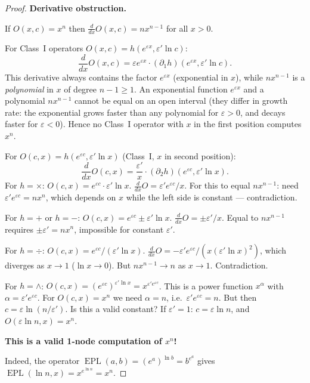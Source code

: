 \documentclass[12pt,a4paper]{article}
\theoremstyle{definition}
\newcommand{\EPL}{\operatorname{EPL}}
\begin{document}
\begin{proof}
\noindent\textbf{Derivative obstruction.}

If $O(x,c)=x^n$ then $\frac{d}{dx}O(x,c) = nx^{n-1}$ for all $x>0$.

For Class~I operators $O(x,c) = h(e^{\varepsilon x}, \varepsilon'\ln c)$:
\[
  \frac{d}{dx}O(x,c) = \varepsilon e^{\varepsilon x} \cdot (\partial_1 h)(e^{\varepsilon x}, \varepsilon'\ln c).
\]
This derivative always contains the factor $e^{\varepsilon x}$ (exponential in $x$),
while $nx^{n-1}$ is a \emph{polynomial} in $x$ of degree $n-1\geq 1$.
An exponential function $e^{\varepsilon x}$ and a polynomial $nx^{n-1}$ cannot be
equal on an open interval (they differ in growth rate: the exponential grows faster
than any polynomial for $\varepsilon>0$, and decays faster for $\varepsilon<0$).
Hence no Class~I operator with $x$ in the first position computes $x^n$.

For $O(c,x) = h(e^{\varepsilon c}, \varepsilon'\ln x)$ (Class~I, $x$ in second position):
\[
  \frac{d}{dx}O(c,x) = \frac{\varepsilon'}{x} \cdot (\partial_2 h)(e^{\varepsilon c}, \varepsilon'\ln x).
\]
For $h=\times$: $O(c,x) = e^{\varepsilon c}\cdot\varepsilon'\ln x$.
$\frac{d}{dx}O = \varepsilon'e^{\varepsilon c}/x$.
For this to equal $nx^{n-1}$: need $\varepsilon'e^{\varepsilon c} = nx^n$, which
depends on $x$ while the left side is constant --- contradiction.

For $h=+$ or $h=-$: $O(c,x) = e^{\varepsilon c} \pm \varepsilon'\ln x$.
$\frac{d}{dx}O = \pm\varepsilon'/x$.
Equal to $nx^{n-1}$ requires $\pm\varepsilon'=nx^n$, impossible for constant $\varepsilon'$.

For $h=\div$: $O(c,x) = e^{\varepsilon c}/(\varepsilon'\ln x)$.
$\frac{d}{dx}O = -\varepsilon'e^{\varepsilon c}/(x(\varepsilon'\ln x)^2)$,
which diverges as $x\to 1$ ($\ln x\to 0$).
But $nx^{n-1}\to n$ as $x\to 1$.  Contradiction.

For $h=\wedge$: $O(c,x) = (e^{\varepsilon c})^{\varepsilon'\ln x} = x^{\varepsilon'e^{\varepsilon c}}$.
This is a power function $x^\alpha$ with $\alpha = \varepsilon'e^{\varepsilon c}$.
For $O(c,x) = x^n$ we need $\alpha = n$, i.e.\ $\varepsilon'e^{\varepsilon c}=n$.
But then $c = \varepsilon\ln(n/\varepsilon')$.  Is this a valid constant?
If $\varepsilon'=1$: $c=\varepsilon\ln n$, and $O(\varepsilon\ln n, x) = x^n$.

\textbf{This is a valid 1-node computation of $x^n$!}

Indeed, the operator $\EPL(a,b) = (e^a)^{\ln b} = b^{e^a}$ gives
$\EPL(\ln n, x) = x^{e^{\ln n}} = x^n$.


\end{proof}
\end{document}
